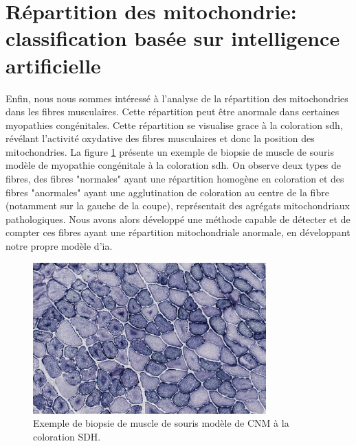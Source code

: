 \section{Répartition des mitochondrie: classification basée sur intelligence artificielle}
Enfin, nous nous sommes intéressé à l'analyse de la répartition des mitochondries dans les fibres musculaires. Cette répartition peut être anormale dans certaines myopathies congénitales. Cette répartition se visualise grace à la coloration \gls{sdh}, révélant l'activité oxydative des fibres musculaires et donc la position des mitochondries. La figure \ref{fig:sdh_example} présente un exemple de biopsie de muscle de souris modèle de myopathie congénitale à la coloration \gls{sdh}. On observe deux types de fibres, des fibres "normales" ayant une répartition homogène en coloration et des fibres "anormales" ayant une agglutination de coloration au centre de la fibre (notamment sur la gauche de la coupe), représentait des agrégats mitochondriaux pathologiques. Nous avons alors développé une méthode capable de détecter et de compter ces fibres ayant une répartition mitochondriale anormale, en développant notre propre modèle d'\gls{ia}.

\begin{figure}[htbp]
 \centering
 \includegraphics[width=0.8\textwidth]{figures/sdh_example.jpg}
 \caption[Exemple de biopsie musculaire à la coloration SDH]{Exemple de biopsie de muscle de souris modèle de CNM à la coloration SDH.}
 \label{fig:sdh_example}
\end{figure}
